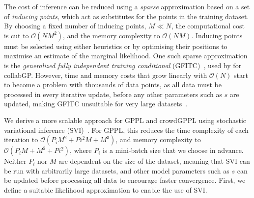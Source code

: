 The cost of inference can be reduced using a \emph{sparse} approximation based on a set of 
\emph{inducing points}, which act as substitutes for the points in the training dataset.
By choosing a fixed number of inducing points, $M \ll N$, the computational cost is cut to $\mathcal{O}(NM^2)$,
and the memory complexity to $\mathcal{O}(NM)$.
Inducing points must be selected %
using either heuristics or by optimising their positions to maximise an estimate of the 
marginal likelihood. 
One such sparse approximation is the \emph{generalized fully independent training conditional} (GFITC)~\citep{NIPS2007_3351,snelson2006sparse}, 
used by \citet{houlsby2012collaborative} for collabGP.
However, time and memory costs that grow linearly with $\mathcal{O}(N)$
start to become a problem with thousands of data points,
as all data must be processed in every iterative update,
before any other parameters such as $s$ are updated,
making GFITC unsuitable for very large datasets~\citep{hensman2015scalable}.

We derive a more scalable approach for GPPL and crowdGPPL using
stochastic variational inference (SVI)~\citep{hoffman2013stochastic}.
For GPPL, this reduces the time complexity of each iteration %
to $\mathcal{O}(P_i M^2 + Pi^2 M + M^3)$,
and memory complexity %
to $\mathcal{O}(P_i M + M^2  + Pi^2)$,
where $P_i$ is a mini-batch size that we choose in advance.
Neither $P_i$ nor $M$ are dependent on the size of the dataset, meaning that SVI 
can be run with arbitrarily large datasets, 
and other model parameters such as $s$ can be updated before processing all data
to encourage faster convergence.
First, we define a suitable likelihood approximation to enable the use of SVI.

